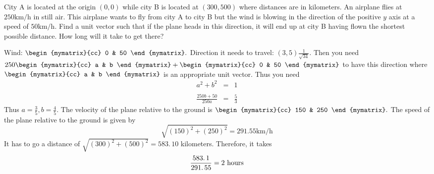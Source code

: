 \begin{enumialphparenastyle}
\begin{ex} 
City A is located at the origin $\left( 0,0 \right)$ while city B is located at $\left(300,500 \right) $ where distances are in kilometers. An airplane flies at $250\textrm{km}/\textrm{h}$ in still air. This airplane wants to fly from city A to city
B but the wind is blowing in the direction of the positive $y$ axis at a
speed of $50\textrm{km}/\textrm{h}$. Find a unit vector such that if the plane heads
in this direction, it will end up at city B having flown the shortest
possible distance. How long will it take to get there? \vspace{1mm}
\begin{sol}
Wind: $\begin{mymatrix}{cc}
0 & 50
\end{mymatrix} .$ Direction it needs to travel: $\left( 3,5 \right) \frac{1}{\sqrt{34}}.$ Then you need $250 \begin{mymatrix}{cc}
 a & b
\end{mymatrix} + \begin{mymatrix}{cc}
0 & 50
\end{mymatrix} $ to
have this direction where $\begin{mymatrix}{cc}
 a & b
\end{mymatrix} $ is an appropriate unit
vector. Thus you need
\begin{eqnarray*}
a^{2}+b^{2} &=&1 \\ 
& & \\
\frac{250b+50}{250a} &=&\frac{5}{3}
\end{eqnarray*}
Thus $a=\frac{3}{5},b=\frac{4}{5}.$ The velocity of the plane relative
to the ground is $\begin{mymatrix}{cc}
150 & 250
\end{mymatrix} .$ The speed of the plane relative to the ground is given by 
\[
\sqrt{\left( 150\right) ^{2}+\left( 250\right) ^{2}}=
291.55 \textrm{km}/\textrm{h}
\]
It has to go a distance of $\sqrt{\left( 300\right) ^{2}+\left( 500\right)
^{2}}=\allowbreak 583.\,\allowbreak 10$ kilometers. Therefore, it takes
\[
\frac{\allowbreak 583.\,\allowbreak 1}{\allowbreak 291.\,\allowbreak 55}=2
\text{ hours}
\]
\end{sol}
\end{ex}


\end{enumialphparenastyle}
